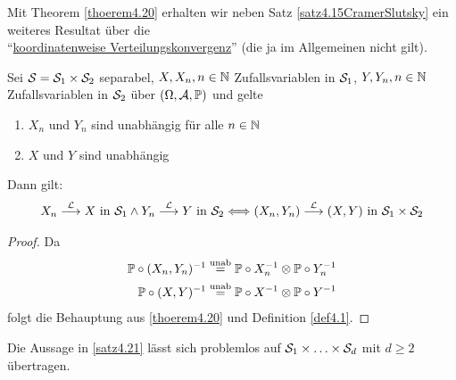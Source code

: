 Mit Theorem \ref{thoerem4.20} erhalten wir neben Satz \ref{satz4.15CramerSlutsky} ein weiteres Resultat über die\\ ``\ul{koordinatenweise Verteilungskonvergenz}'' (die ja im Allgemeinen nicht gilt).

\begin{satz}\label{satz4.21}
Sei $\S=\S_1\times\S_2$ separabel, $X,X_n,n\in\N$ Zufallsvariablen in $\S_1$, $Y,Y_n,n\in\N$ Zufallsvariablen in $\S_2$ über $(\Omega,\A,\P)$ und gelte
\begin{enumerate}
\item $X_n$ und $Y_n$ sind unabhängig für alle $n\in\N$
\item $X$ und $Y$ sind unabhängig
\end{enumerate}
Dann gilt:
\begin{align*}
X_n\stackrel{\L}{\longrightarrow} X\text{ in }\S_1\wedge Y_n\stackrel{\L}{\longrightarrow} Y\text{ in }\S_2
\Longleftrightarrow (X_n,Y_n)\stackrel{\L}{\longrightarrow}(X,Y)\text{ in }\S_1\times\S_2
\end{align*}
\end{satz}
\begin{proof}
Da
\begin{align*}
\P\circ (X_n,Y_n)^{-1}&\stackeq{\text{unab}}\P\circ X_n^{-1}\otimes\P\circ Y_n^{-1}\\
\P\circ (X,Y)^{-1}&\stackeq{\text{unab}}\P\circ X^{-1}\otimes\P\circ Y^{-1}
\end{align*}
folgt die Behauptung aus \ref{thoerem4.20} und Definition \ref{def4.1}.
\end{proof}

\begin{bemerkungnr}\label{bemerkung4.22}
Die Aussage in \ref{satz4.21} lässt sich problemlos auf $\S_1\times\ldots\times\S_d$ mit $d\geq2$ übertragen.
\end{bemerkungnr}

